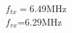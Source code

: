 \documentclass[preview]{standalone}
\begin{document}
\begin{center}
$f_{tx}=$6.49MHz\\$f_{rx}$=6.29MHz
\end{center}
\end{document}

